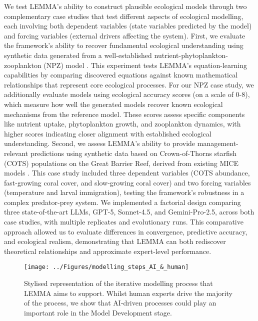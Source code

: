 We test LEMMA's ability to construct plausible ecological models through two complementary case studies that test different aspects of ecological modelling, each involving both dependent variables (state variables predicted by the model) and forcing variables (external drivers affecting the system). First, we evaluate the framework's ability to recover fundamental ecological understanding using synthetic data generated from a well-established nutrient-phytoplankton-zooplankton (NPZ) model \citep{edwards1999zooplankton}.  This experiment tests LEMMA's equation-learning capabilities by comparing discovered equations against known mathematical relationships that represent core ecological processes. For our NPZ case study, we additionally evaluate models using ecological accuracy scores (on a scale of 0-8), which measure how well the generated models recover known ecological mechanisms from the reference model. These scores assess specific components like nutrient uptake, phytoplankton growth, and zooplankton dynamics, with higher scores indicating closer alignment with established ecological understanding. Second, we assess LEMMA's ability to provide management-relevant predictions using synthetic data based on Crown-of-Thorns starfish (COTS) populations on the Great Barrier Reef, derived from existing MICE models \citep{morello2014model, Rogers_Plaganyi_2022,Plaganyi_Punt_Hillary_Morello_Thebaud_Hutton_Pillans_Thorson_Fulton_Smith_et_al_2014, Condie_Anthony_Babcock_Baird_Beeden_Fletcher_Gorton_Harrison_Hobday_Plaganyi_et_al_2021}. This case study included three dependent variables (COTS abundance, fast-growing coral cover, and slow-growing coral cover) and two forcing variables (temperature and larval immigration), testing the framework's robustness in a complex predator-prey system. We implemented a factorial design comparing three state-of-the-art LLMs, GPT-5, Sonnet-4.5, and Gemini-Pro-2.5, across both case studies, with multiple replicates and evolutionary runs. This comparative approach allowed us to evaluate differences in convergence, predictive accuracy, and ecological realism, demonstrating that LEMMA can both rediscover theoretical relationships and approximate expert-level performance.

\begin{figure}[H]
    \centering
    \texttt{[image: ../Figures/modelling\_steps\_AI\_\&\_human]}
    \caption{Stylised representation of the iterative modelling process that LEMMA aims to support. Whilst human experts drive the majority of the process, we show that AI-driven processes could play an important role in the Model Development stage.}
    \label{fig:modelling_intro}
    \end{figure}